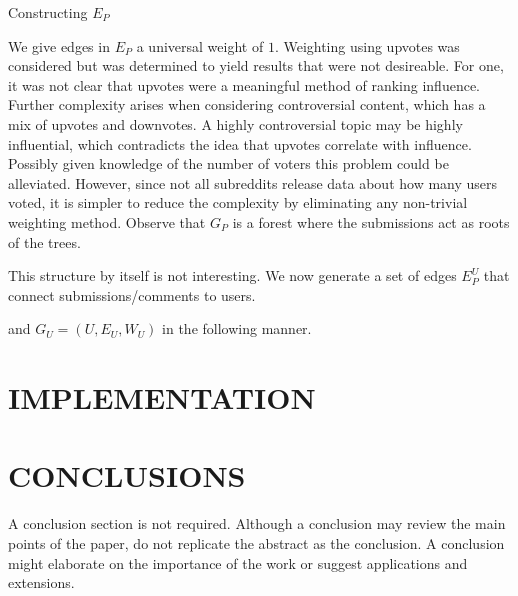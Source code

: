 \documentclass[letterpaper, 10 pt, conference]{ieeeconf}
\theoremstyle{plain}
\begin{document}
\begin{algorithm}
  \caption{Constructing \(E_P\)}
  \label{alg:ep}
\end{algorithm}
We give edges in \(E_P\) a universal weight of \(1.\) Weighting using upvotes was considered but was determined to yield results that were not desireable. For one, it was not clear that upvotes were a meaningful method of ranking influence. Further complexity arises when considering controversial content, which has a mix of upvotes and downvotes. A highly controversial topic may be highly influential, which contradicts the idea that upvotes correlate with influence. Possibly given knowledge of the number of voters this problem could be alleviated. However, since not all subreddits release data about how many users voted, it is simpler to reduce the complexity by eliminating any non-trivial weighting method. Observe that \(G_P\) is a forest where the submissions act as roots of the trees.

This structure by itself is not interesting. We now generate a set of edges \(E_P^U\) that connect submissions/comments to users. 

and \(G_U=(U,E_U,W_U)\) in the following manner.

\section{IMPLEMENTATION}

\section{CONCLUSIONS}

A conclusion section is not required. Although a conclusion may review the main points of the paper, do not replicate the abstract as the conclusion. A conclusion might elaborate on the importance of the work or suggest applications and extensions. 

\addtolength{\textheight}{-12cm}   %
\end{document}
